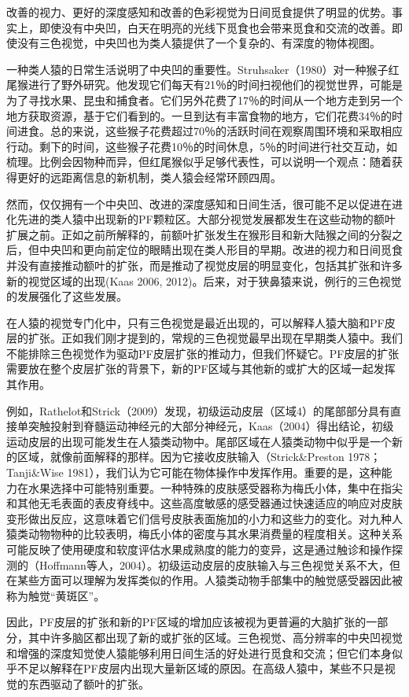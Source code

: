 改善的视力、更好的深度感知和改善的色彩视觉为日间觅食提供了明显的优势。事实上，即使没有中央凹，白天在明亮的光线下觅食也会带来觅食和交流的改善。即使没有三色视觉，中央凹也为类人猿提供了一个复杂的、有深度的物体视图。

一种类人猿的日常生活说明了中央凹的重要性。Struhsaker（1980）对一种猴子红尾猴进行了野外研究。他发现它们每天有21％的时间扫视他们的视觉世界，可能是为了寻找水果、昆虫和捕食者。它们另外花费了17％的时间从一个地方走到另一个地方获取资源，基于它们看到的。一旦到达有丰富食物的地方，它们花费34％的时间进食。总的来说，这些猴子花费超过70％的活跃时间在观察周围环境和采取相应行动。剩下的时间，这些猴子花费10％的时间休息，5％的时间进行社交互动，如梳理。比例会因物种而异，但红尾猴似乎足够代表性，可以说明一个观点：随着获得更好的远距离信息的新机制，类人猿会经常环顾四周。

然而，仅仅拥有一个中央凹、改进的深度感知和日间生活，很可能不足以促进在进化先进的类人猿中出现新的PF颗粒区。大部分视觉发展都发生在这些动物的额叶扩展之前。正如之前所解释的，前额叶扩张发生在猴形目和新大陆猴之间的分裂之后，但中央凹和更向前定位的眼睛出现在类人形目的早期。改进的视力和日间觅食并没有直接推动额叶的扩张，而是推动了视觉皮层的明显变化，包括其扩张和许多新的视觉区域的出现(Kaas 2006, 2012)。后来，对于狭鼻猿来说，例行的三色视觉的发展强化了这些发展。

在人猿的视觉专门化中，只有三色视觉是最近出现的，可以解释人猿大脑和PF皮层的扩张。正如我们刚才提到的，常规的三色视觉最早出现在早期类人猿中。我们不能排除三色视觉作为驱动PF皮层扩张的推动力，但我们怀疑它。PF皮层的扩张需要放在整个皮层扩张的背景下，新的PF区域与其他新的或扩大的区域一起发挥其作用。

例如，Rathelot和Strick（2009）发现，初级运动皮层（区域4）的尾部部分具有直接单突触投射到脊髓运动神经元的大部分神经元，Kaas（2004）得出结论，初级运动皮层的出现可能发生在人猿类动物中。尾部区域在人猿类动物中似乎是一个新的区域，就像前面解释的那样。因为它接收皮肤输入（Strick\&Preston 1978；Tanji\&Wise 1981），我们认为它可能在物体操作中发挥作用。重要的是，这种能力在水果选择中可能特别重要。一种特殊的皮肤感受器称为梅氏小体，集中在指尖和其他无毛表面的表皮脊线中。这些高度敏感的感受器通过快速适应的响应对皮肤变形做出反应，这意味着它们信号皮肤表面施加的小力和这些力的变化。对九种人猿类动物物种的比较表明，梅氏小体的密度与其水果消费量的程度相关。这种关系可能反映了使用硬度和软度评估水果成熟度的能力的变异，这是通过触诊和操作探测的（Hoffmann等人，2004）。初级运动皮层的皮肤输入与三色视觉关系不大，但在某些方面可以理解为发挥类似的作用。人猿类动物手部集中的触觉感受器因此被称为触觉“黄斑区”。

因此，PF皮层的扩张和新的PF区域的增加应该被视为更普遍的大脑扩张的一部分，其中许多脑区都出现了新的或扩张的区域。三色视觉、高分辨率的中央凹视觉和增强的深度知觉使人猿能够利用日间生活的好处进行觅食和交流；但它们本身似乎不足以解释在PF皮层内出现大量新区域的原因。在高级人猿中，某些不只是视觉的东西驱动了额叶的扩张。

